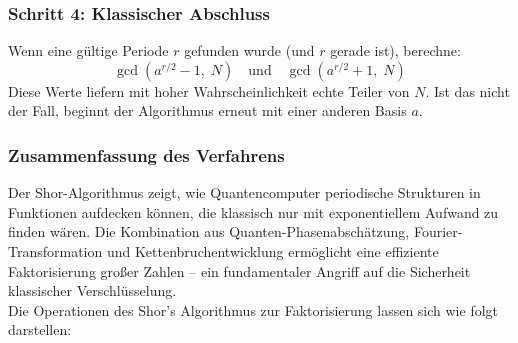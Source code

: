\subsubsection*{Schritt 4: Klassischer Abschluss}
Wenn eine gültige Periode \( r \) gefunden wurde (und \( r \) gerade ist), berechne:
\[
\gcd\left(a^{r/2} - 1,\; N\right) \quad \text{und} \quad \gcd\left(a^{r/2} + 1,\; N\right)
\]
Diese Werte liefern mit hoher Wahrscheinlichkeit echte Teiler von \( N \). Ist das nicht der Fall, beginnt der Algorithmus erneut mit einer anderen Basis \( a \).

\subsubsection*{Zusammenfassung des Verfahrens}
Der Shor-Algorithmus zeigt, wie Quantencomputer periodische Strukturen in Funktionen aufdecken können, die klassisch nur mit exponentiellem Aufwand zu finden wären. Die Kombination aus Quanten-Phasenabschätzung, Fourier-Transformation und Kettenbruchentwicklung ermöglicht eine effiziente Faktorisierung großer Zahlen – ein fundamentaler Angriff auf die Sicherheit klassischer Verschlüsselung.\\

\noindent Die Operationen des Shor's Algorithmus zur Faktorisierung lassen sich wie folgt darstellen:

